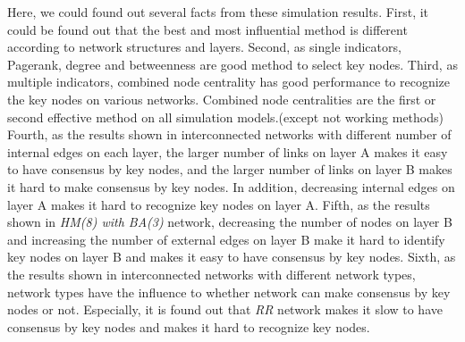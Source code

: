 Here, we could found out several facts from these simulation results. First, it could be found out that the best and most influential method is different according to network structures and layers. Second, as single indicators, Pagerank, degree and betweenness are good method to select key nodes. Third, as multiple indicators, combined node centrality has good performance to recognize the key nodes on various networks. Combined node centralities are the first or second effective method on all simulation models.(except not working methods)  Fourth, as the results shown in interconnected networks with different number of internal edges on each layer, the larger number of links on layer A makes it easy to have consensus by key nodes, and the larger number of links on layer B makes it hard to make consensus by key nodes. In addition, decreasing internal edges on layer A makes it hard to recognize key nodes on layer A.  Fifth, as the results shown in \textit{HM(8) with BA(3)} network, decreasing the number of nodes on layer B and increasing the number of external edges on layer B make it hard to identify key nodes on layer B and makes it easy to have consensus by key nodes. Sixth, as the results shown in interconnected networks with different network types, network types have the influence to whether network can make consensus by key nodes or not. Especially, it is found out that \textit{RR} network makes it slow to have consensus by key nodes and makes it hard to recognize key nodes. 



